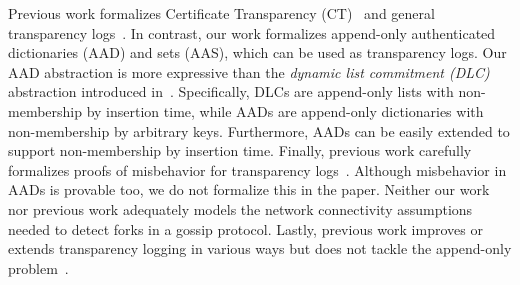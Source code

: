 %
%
%
Previous work formalizes Certificate Transparency (CT)~\cite{transparency-overlays,secure-logging-schemes-and-ct} and general transparency logs~\cite{transparency-overlays}.
In contrast, our work formalizes append-only authenticated dictionaries (AAD) and sets (AAS), which can be used as transparency logs.
Our AAD abstraction is more expressive than the \textit{dynamic list commitment (DLC)} abstraction introduced in~\cite{transparency-overlays}.
Specifically, DLCs are append-only lists with non-membership by insertion time, while AADs are append-only dictionaries with non-membership by arbitrary keys.
Furthermore, AADs can be easily extended to support non-membership by insertion time.
Finally, previous work carefully formalizes proofs of misbehavior for transparency logs~\cite{transparency-overlays,secure-logging-schemes-and-ct}.
Although misbehavior in AADs is provable too, we do not formalize this in the paper.
%
%
%
%
Neither our work nor previous work adequately models the network connectivity assumptions needed to detect forks in a gossip protocol.
Lastly, previous work improves or extends transparency logging in various ways but does not tackle the append-only problem~\cite{ct-with-privacy,insynd,lwm}.
